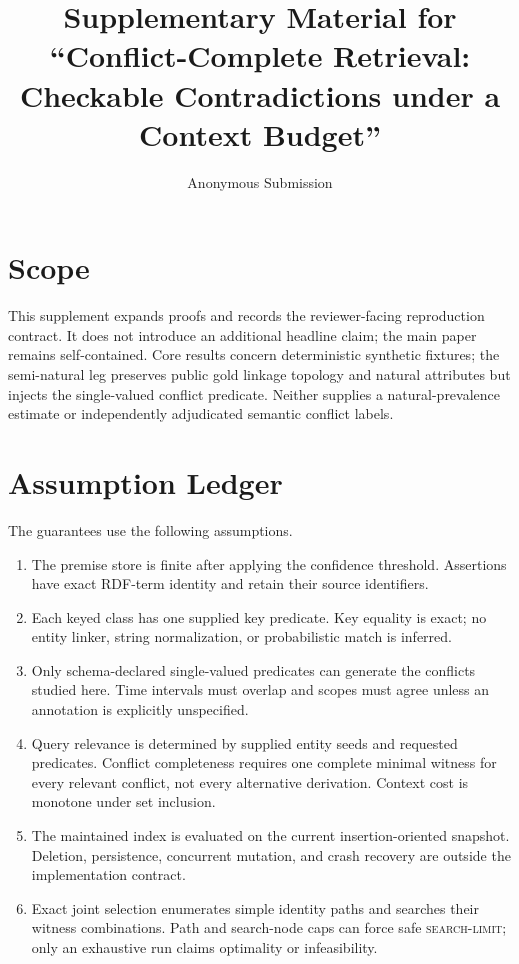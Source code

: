 \documentclass[letterpaper]{article}
\title{Supplementary Material for ``Conflict-Complete Retrieval:
Checkable Contradictions under a Context Budget''}
\author{Anonymous Submission}
\begin{document}
\maketitle

\section{Scope}

This supplement expands proofs and records the reviewer-facing reproduction
contract.  It does not introduce an additional headline claim; the main paper
remains self-contained.
Core results concern deterministic synthetic fixtures; the semi-natural leg
preserves public gold linkage topology and natural attributes but injects the
single-valued conflict predicate.  Neither supplies a natural-prevalence
estimate or independently adjudicated semantic conflict labels.

\section{Assumption Ledger}

The guarantees use the following assumptions.
\begin{enumerate}
  \item The premise store is finite after applying the confidence threshold.
  Assertions have exact RDF-term identity and retain their source identifiers.
  \item Each keyed class has one supplied key predicate.  Key equality is exact;
  no entity linker, string normalization, or probabilistic match is inferred.
  \item Only schema-declared single-valued predicates can generate the conflicts
  studied here.  Time intervals must overlap and scopes must agree unless an
  annotation is explicitly unspecified.
  \item Query relevance is determined by supplied entity seeds and requested
  predicates.  Conflict completeness requires one complete minimal witness for
  every relevant conflict, not every alternative derivation.  Context cost is
  monotone under set inclusion.
  \item The maintained index is evaluated on the current insertion-oriented
  snapshot.  Deletion, persistence, concurrent mutation, and crash recovery are
  outside the implementation contract.
  \item Exact joint selection enumerates simple identity paths and searches
  their witness combinations.  Path and search-node caps can force safe
  \textsc{search-limit}; only an exhaustive run claims optimality or
  infeasibility.
\end{enumerate}
\end{document}
